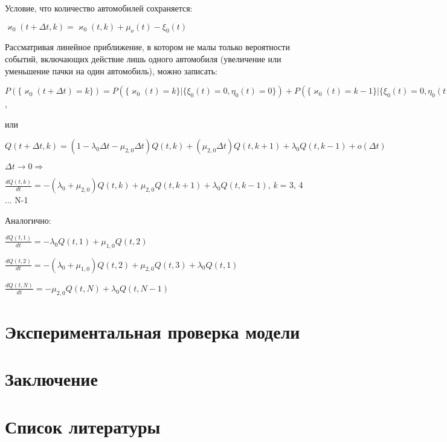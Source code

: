 \documentclass[a4paper, 14pt, russian]{article}
\begin{document}
Условие, что количество автомобилей сохраняется:

$\varkappa_0(t + \Delta t, k) = \varkappa_0(t, k) + \mu_o(t) - \xi_0(t)$

Рассматривая линейное приближение, в котором не малы только вероятности событий, включающих действие лишь одного автомобиля (увеличение или уменьшение пачки на один автомобиль), можно записать:

$P(\{\varkappa_0(t + \Delta t) = k\}) = P(\{\varkappa_0(t) = k\} | \{\xi_0(t) = 0, \eta_0(t) = 0\}) + P(\{\varkappa_0(t) = k-1\} | \{\xi_0(t) = 0, \eta_0(t) = 1\}) + 
P(\{\varkappa_0(t) = k+1\} | \{\xi_0(t) = 1, \eta_0(t) = 0\}) + o(\Delta t)$,

или

$Q(t + \Delta t, k) = (1 - \lambda_0 \Delta t - \mu_{2,0} \Delta t ) Q(t, k) + (\mu_{2,0} \Delta t) Q(t, k+1) + \lambda_0 Q(t, k-1) + o(\Delta t)$

$\Delta t \rightarrow 0\Rightarrow $

$\frac{dQ(t, k)}{dt} = -(\lambda_0 + \mu_{2,0}) Q(t, k) + \mu_{2,0} Q(t, k + 1) + 
\lambda_0 Q(t, k-1)$, \textit{k} = 3, 4 ... N-1

Аналогично:

$\frac{dQ(t, 1)}{dt} = -\lambda_0 Q(t, 1) + \mu_{1,0} Q(t, 2)$

$\frac{dQ(t, 2)}{dt} = -(\lambda_0 + \mu_{1,0}) Q(t, 2) + \mu_{2,0} Q(t, 3) + 
\lambda_0 Q(t, 1)$

$\frac{dQ(t, N)}{dt} = - \mu_{2,0} Q(t, N) + \lambda_0 Q(t, N - 1)$

\section{Экспериментальная проверка модели}

\section{Заключение}

\section{Список литературы}
\end{document}
